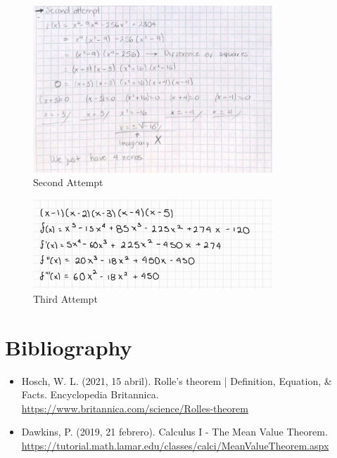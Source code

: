 \documentclass{article}
\begin{document}
    \begin{figure}[H]
        \includegraphics[width=340px]{img/secondattempt.png}
        \caption{Second Attempt}
    \end{figure}

    \begin{figure}[H]
        \includegraphics[width=340px]{img/thirdattempt.png}
        \caption{Third Attempt}
    \end{figure}

    \pagebreak
    \section{Bibliography}
    \begin{itemize}
        \item Hosch, W. L. (2021, 15 abril). Rolle’s theorem | Definition, Equation, \& Facts. Encyclopedia Britannica. \\
        \href{https://www.britannica.com/science/Rolles-theorem}{https://www.britannica.com/science/Rolles-theorem}

        \item Dawkins, P. (2019, 21 febrero). Calculus I - The Mean Value Theorem. \\
        \href{https://tutorial.math.lamar.edu/classes/calci/MeanValueTheorem.aspx}{https://tutorial.math.lamar.edu/classes/calci/MeanValueTheorem.aspx}
    \end{itemize}
\end{document}
